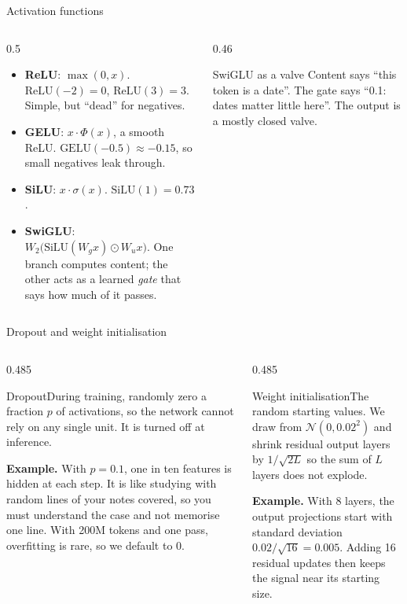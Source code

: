 \documentclass[aspectratio=169,11pt]{beamer}
\newcommand{\term}[3]{%
  \begin{block}{#1}\small #2\par\vspace{1mm}%
  {\color{exgreen}\textbf{Example.}} #3\end{block}}
\newcommand{\twoterms}[6]{%
  \begin{columns}[T]
    \begin{column}{0.485\textwidth}\term{#1}{#2}{#3}\end{column}
    \begin{column}{0.485\textwidth}\term{#4}{#5}{#6}\end{column}
  \end{columns}}
\begin{document}
\begin{frame}{Activation functions}
  \begin{columns}[T]
    \begin{column}{0.5\textwidth}
      \small
      \begin{itemize}
        \item \textbf{ReLU}: $\max(0,x)$. $\text{ReLU}(-2)=0$, $\text{ReLU}(3)=3$. Simple, but ``dead'' for negatives.
        \item \textbf{GELU}: $x\cdot\Phi(x)$, a smooth ReLU. $\text{GELU}(-0.5)\approx-0.15$, so small negatives leak through.
        \item \textbf{SiLU}: $x\cdot\sigma(x)$. $\text{SiLU}(1)=0.73$.
        \item \textbf{SwiGLU}: $W_2\big(\text{SiLU}(W_gx)\odot W_ux\big)$. One branch computes content; the other acts as a learned \emph{gate} that says how much of it passes.
      \end{itemize}
    \end{column}
    \begin{column}{0.46\textwidth}
      \centering
      \begin{exampleblock}{SwiGLU as a valve}
        \small
        Content says ``this token is a date''. The gate says ``0.1: dates matter little here''. The output is a mostly closed valve.
      \end{exampleblock}
    \end{column}
  \end{columns}
\end{frame}

\begin{frame}{Dropout and weight initialisation}
  \twoterms{Dropout}
  {During training, randomly zero a fraction $p$ of activations, so the network cannot rely on any single unit. It is turned off at inference.}
  {With $p=0.1$, one in ten features is hidden at each step. It is like studying with random lines of your notes covered, so you must understand the case and not memorise one line. With 200M tokens and one pass, overfitting is rare, so we default to 0.}
  {Weight initialisation}
  {The random starting values. We draw from $\mathcal{N}(0,0.02^2)$ and shrink residual output layers by $1/\sqrt{2L}$ so the sum of $L$ layers does not explode.}
  {With 8 layers, the output projections start with standard deviation $0.02/\sqrt{16}=0.005$. Adding 16 residual updates then keeps the signal near its starting size.}
\end{frame}
\end{document}

